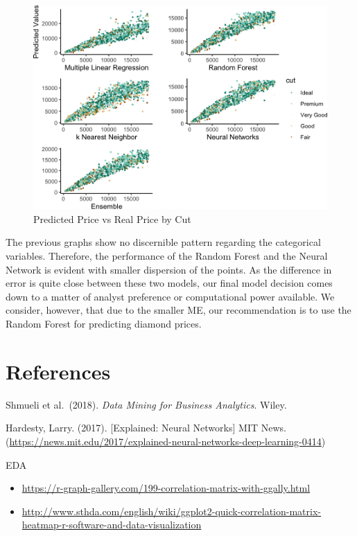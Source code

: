 \documentclass[
  paper=a4,
  ,captions=tableheading
]{scrartcl}
\providecommand{\tightlist}{%
  \setlength{\itemsep}{0pt}\setlength{\parskip}{0pt}}
\begin{document}
\begin{figure}[H]

{\centering \includegraphics[width=\linewidth,]{Diamonds_PDF_files/figure-latex/Summ Cut Plots-1} 

}

\caption{Predicted Price vs Real Price by Cut}\label{fig:Summ Cut Plots}
\end{figure}

The previous graphs show no discernible pattern regarding the
categorical variables. Therefore, the performance of the Random Forest
and the Neural Network is evident with smaller dispersion of the points.
As the difference in error is quite close between these two models, our
final model decision comes down to a matter of analyst preference or
computational power available. We consider, however, that due to the
smaller ME, our recommendation is to use the Random Forest for
predicting diamond prices.

\newpage

\hypertarget{references}{%
\section{References}\label{references}}

Shmueli et al.~(2018). \emph{Data Mining for Business Analytics}. Wiley.

Hardesty, Larry. (2017). {[}Explained: Neural Networks{]} MIT News.
(\url{https://news.mit.edu/2017/explained-neural-networks-deep-learning-0414})

EDA

\begin{itemize}
\tightlist
\item
  \url{https://r-graph-gallery.com/199-correlation-matrix-with-ggally.html}
\item
  \url{http://www.sthda.com/english/wiki/ggplot2-quick-correlation-matrix-heatmap-r-software-and-data-visualization}
\end{itemize}
\end{document}
